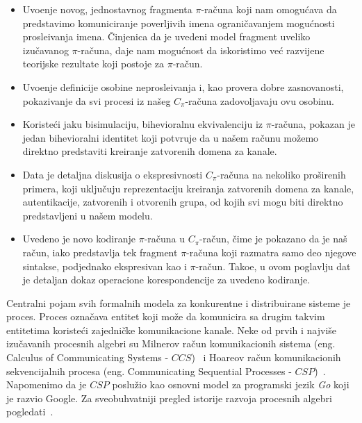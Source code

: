  \begin{itemize}
 \item  Uvo\dj enje novog, jednostavnog fragmenta $\pi$-ra\v cuna koji nam omogu\' cava da predstavimo komuniciranje poverljivih imena ograni\v cavanjem mogu\' cnosti prosle\dj ivanja imena. \v Cinjenica da je uvedeni model fragment uveliko izu\v cavanog $\pi$-ra\v cuna, daje nam mogu\' cnost da iskoristimo  ve\' c razvijene teorijske rezultate koji postoje za $\pi$-ra\v cun.
 \item Uvo\dj enje definicije osobine neprosle\dj ivanja i, kao provera dobre zasnovanosti, pokazivanje da svi procesi iz na\v seg $C_\pi$-ra\v cuna zadovoljavaju ovu osobinu.
 \item Koriste\' ci jaku bisimulaciju, bihevioralnu ekvivalenciju iz $\pi$-ra\v cuna, pokazan je jedan bihevioralni identitet koji potvr\dj uje da u na\v sem ra\v cunu mo\v zemo direktno predstaviti kreiranje zatvorenih domena za kanale.
 \item Data je detaljna diskusija o ekspresivnosti $C_\pi$-ra\v cuna na nekoliko pro\v sirenih primera, koji uklju\v cuju reprezentaciju kreiranja zatvorenih domena za kanale, autentikacije, zatvorenih i otvorenih grupa, od kojih svi mogu biti direktno predstavljeni u na\v sem modelu. 
 \item Uvedeno je novo kodiranje $\pi$-ra\v cuna u $C_\pi$-ra\v cun, \v cime je pokazano da je na\v s ra\v cun, iako predstavlja tek fragment $\pi$-ra\v cuna koji razmatra samo deo njegove sintakse, podjednako ekspresivan kao i $\pi$-ra\v cun. Tako\dj e, u ovom poglavlju dat je detaljan dokaz operacione korespondencije za uvedeno kodiranje.
 \end{itemize}


Centralni pojam svih formalnih modela za konkurentne i distribuirane sisteme je proces. Proces ozna\v cava entitet koji mo\v ze da komunicira sa drugim  takvim entitetima koriste\' ci zajedni\v cke komunikacione kanale. 
Neke od prvih i najvi\v se izu\v cavanih procesnih algebri su Milnerov ra\v cun komunikacionih sistema (eng. Calculus of Communicating Systems - $CCS$)~\cite{DBLP:books/sp/Milner80} i Hoareov ra\v cun komunikacionih sekvencijalnih procesa (eng. Communicating Sequential Processes - $CSP$)~\cite{DBLP:books/ph/Hoare85}. 
Napomenimo da je $CSP$ poslu\v zio kao osnovni model za programski jezik \emph{Go} koji je razvio Google. 
Za sveobuhvatniji pregled istorije razvoja procesnih algebri pogledati~\cite{DBLP:journals/tcs/Baeten05}.


